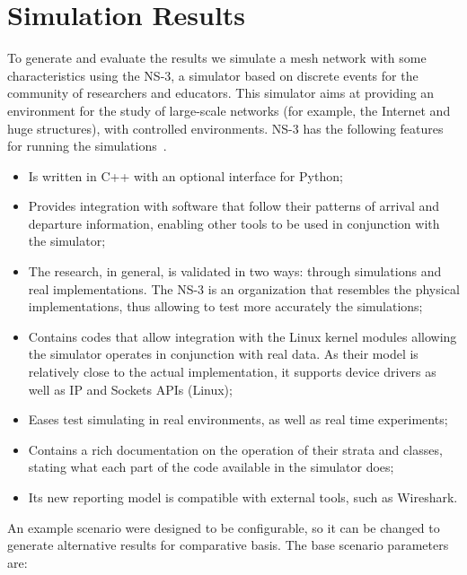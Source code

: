 \documentclass[10pt, conference, compsocconf]{IEEEtran}
\begin{document}
\section{Simulation Results}

To generate and evaluate the results we simulate a mesh network with some characteristics using the NS-3, a simulator based on discrete events for the community of researchers and educators. This simulator aims at providing an environment for the study of large-scale networks (for example, the Internet and huge structures), with controlled environments. NS-3 has the following features for running the simulations~\cite{NS3:1}.

\begin{itemize}
	\item Is written in C++ with an optional interface for Python;
	\item Provides integration with software that follow their patterns of arrival and departure information, enabling other tools to be used in conjunction with the simulator;
	\item The research, in general, is validated in two ways: through simulations and real implementations. The NS-3 is an organization that resembles the physical implementations, thus allowing to test more accurately the simulations;
	\item Contains codes that allow integration with the Linux kernel modules allowing the simulator operates in conjunction with real data. As their model is relatively close to the actual implementation, it supports device drivers as well as IP and Sockets APIs (Linux);
	\item Eases test simulating in real environments, as well as real time experiments;
	\item Contains a rich documentation on the operation of their strata and classes, stating what each part of the code available in the simulator does;
	\item Its new reporting model is compatible with external tools, such as Wireshark.
\end{itemize}


An example scenario were designed to be configurable, so it can be changed to generate alternative results for comparative basis. The base scenario parameters are:
\end{document}
